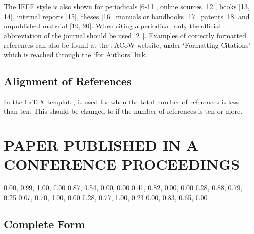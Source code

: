 The IEEE style is also shown for periodicals [6-11],
online sources [12], books [13, 14], internal reports [15],
theses [16], manuals or handbooks [17], patents [18] and
unpublished material [19, 20]. When citing a periodical,
only the official abbreviation of the journal should be used
[21]. Examples of correctly formatted references can also be 
found at the JACoW website, under ‘Formatting Citations’ which 
is reached through the ‘for Authors’ link.

\subsection{Alignment of References}

In the \LaTeX{} template, \verb|| is used for
when the total number of references is less than ten. This
should be changed to \verb|| if the number of
references is ten or more.

\patchcmd{}
\section{PAPER PUBLISHED IN A CONFERENCE PROCEEDINGS}

\definecolor{jred}{cmyk}  {0.00, 0.99, 1.00, 0.00}
\definecolor{jblue}{cmyk} {0.87, 0.54, 0.00, 0.00}
\definecolor{jvio}{cmyk}  {0.41, 0.82, 0.00, 0.00}
\definecolor{jbook}{cmyk} {0.28, 0.88, 0.79, 0.25}
\definecolor{jrept}{cmyk} {0.07, 0.70, 1.00, 0.00}
\definecolor{jmanu}{cmyk} {0.28, 0.77, 1.00, 0.23}
\definecolor{junpu}{cmyk} {0.00, 0.83, 0.65, 0.00}


\subsection{Complete Form}

